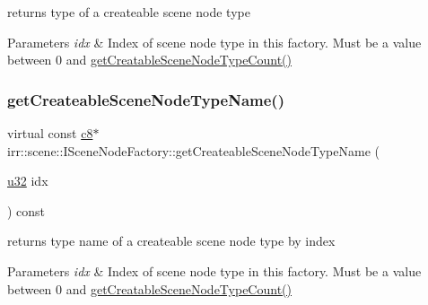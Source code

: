 returns type of a createable scene node type 


\begin{DoxyParams}{Parameters}
{\em idx} & Index of scene node type in this factory. Must be a value between 0 and \hyperlink{classirr_1_1scene_1_1ISceneNodeFactory_a3c1be487fb0169ee9fbb7169c451d16e}{get\+Creatable\+Scene\+Node\+Type\+Count()} \\
\hline
\end{DoxyParams}
\mbox{\label{classirr_1_1scene_1_1ISceneNodeFactory_a259f156cc367a9a89f79159ad2b665ac}} 
\subsubsection{\texorpdfstring{get\+Createable\+Scene\+Node\+Type\+Name()}{getCreateableSceneNodeTypeName()}\hspace{0.1cm}{\footnotesize\ttfamily [1/2]}}
{\footnotesize\ttfamily virtual const \hyperlink{namespaceirr_a9395eaea339bcb546b319e9c96bf7410}{c8}$\ast$ irr\+::scene\+::\+I\+Scene\+Node\+Factory\+::get\+Createable\+Scene\+Node\+Type\+Name (\begin{DoxyParamCaption}\item[{\hyperlink{namespaceirr_a0416a53257075833e7002efd0a18e804}{u32}}]{idx }\end{DoxyParamCaption}) const\hspace{0.3cm}{\ttfamily [pure virtual]}}



returns type name of a createable scene node type by index 


\begin{DoxyParams}{Parameters}
{\em idx} & Index of scene node type in this factory. Must be a value between 0 and \hyperlink{classirr_1_1scene_1_1ISceneNodeFactory_a3c1be487fb0169ee9fbb7169c451d16e}{get\+Creatable\+Scene\+Node\+Type\+Count()} \\
\hline
\end{DoxyParams}
\mbox{\label{classirr_1_1scene_1_1ISceneNodeFactory_addc09a5ab7a8d8b65182fbaa09c88b6f}} 
